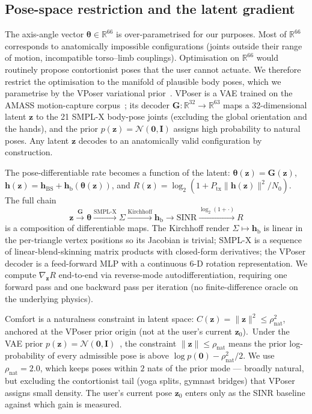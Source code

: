 \documentclass[journal,twocolumn,10pt]{IEEEtran}
\theoremstyle{plain}
\theoremstyle{definition}
\theoremstyle{remark}
\newcommand{\hh}{\bm{h}}
\newcommand{\thetab}{\bm{\theta}}
\newcommand{\hBS}{\bm{h}_{\mathrm{BS}}}
\newcommand{\hbody}{\bm{h}_{\mathrm{b}}}
\newcommand{\Reals}{\mathbb{R}}
\begin{document}
\subsection{Pose-space restriction and the latent gradient}\label{sec:vposer-latent}

The axis-angle vector $\thetab \in \Reals^{66}$ is over-parametrised
for our purposes. Most of $\Reals^{66}$ corresponds to anatomically
impossible configurations (joints outside their range of motion,
incompatible torso--limb couplings). Optimisation on $\Reals^{66}$
would routinely propose contortionist poses that the user cannot
actuate. We therefore restrict the optimisation to the manifold of
plausible body poses, which we parametrise by the VPoser variational
prior~\cite{Pavlakos2019VPoser}. VPoser is a VAE trained on the AMASS
motion-capture corpus~\cite{AMASS2019}; its decoder
$\bm{G}: \Reals^{32} \to \Reals^{63}$ maps a 32-dimensional latent
$\bm{z}$ to the 21 SMPL-X body-pose joints (excluding the global
orientation and the hands), and the prior $p(\bm{z}) = \mathcal{N}(\bm{0},
\bm{I})$ assigns high probability to natural poses. Any latent
$\bm{z}$ decodes to an anatomically valid configuration by
construction.

The pose-differentiable rate becomes a function of the latent:
$\thetab(\bm{z}) = \bm{G}(\bm{z})$,
$\hh(\bm{z}) = \hBS + \hbody(\thetab(\bm{z}))$, and
$R(\bm{z}) = \log_2(1 + P_{\mathrm{tx}}\|\hh(\bm{z})\|^{2}/N_0)$.
The full chain
\begin{equation}\label{eq:autodiff-chain}
\bm{z} \xrightarrow{\bm{G}} \thetab \xrightarrow{\mathrm{SMPL\text{-}X}}
\Sigma \xrightarrow{\mathrm{Kirchhoff}} \hbody \xrightarrow{}
\mathrm{SINR} \xrightarrow{\log_2(1 + \cdot)} R
\end{equation}
is a composition of differentiable maps. The Kirchhoff render
$\Sigma \mapsto \hbody$ is linear in the per-triangle vertex
positions so its Jacobian is trivial; SMPL-X is a sequence of
linear-blend-skinning matrix products with closed-form derivatives;
the VPoser decoder is a feed-forward MLP with a continuous
6-D rotation representation. We compute $\nabla_{\bm{z}} R$ end-to-end
via reverse-mode autodifferentiation, requiring one forward pass and
one backward pass per iteration (no finite-difference oracle on the
underlying physics).

Comfort is a naturalness constraint in latent space:
$C(\bm{z}) = \|\bm{z}\|^{2} \leq \rho_\mathrm{nat}^{2}$, anchored
at the VPoser prior origin (not at the user's current
$\bm{z}_0$).~Under the VAE prior $p(\bm{z}) =
\mathcal{N}(\bm{0},\bm{I})$~\cite{Pavlakos2019VPoser}, the
constraint $\|\bm{z}\| \leq \rho_\mathrm{nat}$ means the prior
log-probability of every admissible pose is above
$\log p(\bm{0}) - \rho_\mathrm{nat}^{2}/2$. We use
$\rho_\mathrm{nat} = 2.0$, which keeps poses within $2$ nats of the
prior mode --- broadly natural, but excluding the
contortionist tail (yoga splits, gymnast bridges) that VPoser
assigns small density. The user's current pose $\bm{z}_0$ enters
only as the SINR baseline against which gain is measured.
\end{document}
